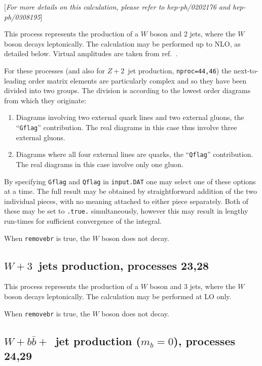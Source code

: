 \documentclass[12pt]{article}
\begin{document}
\begin{center}
[{\it For more details on this calculation, please refer to \break
 hep-ph/0202176 and hep-ph/0308195}]
\end{center}
This process represents the production of a $W$ boson and $2$ jets,
where the $W$ boson decays leptonically. The calculation may be
performed up to NLO, as detailed below. Virtual amplitudes are
taken from ref.~\cite{Bern:1997sc}.

For these processes (and also for $Z+2$~jet production, {\tt nproc=44,46})
the next-to-leading order matrix elements are
particularly complex and so they have been divided into two groups.
The division is according to the lowest order diagrams from which they
originate:
\begin{enumerate}
\item Diagrams involving two external quark lines and two external gluons,
the ``{\tt Gflag}'' contribution. The real diagrams in this case thus
involve three external gluons.

\item Diagrams where all four external lines are quarks,
the ``{\tt Qflag}'' contribution. The real diagrams in this case 
involve only one gluon.
\end{enumerate}

By specifying {\tt Gflag} and {\tt Qflag} in {\tt input.DAT} one may
select one of these options at a time. The full result may be obtained
by straightforward addition of the two individual pieces, with no
meaning attached to either piece separately. 
Both of these may be set to {\tt .true.} simultaneously, however this
may result in lengthy run-times for sufficient convergence of the integral.

When {\tt removebr} is true, the $W$ boson does not decay.

\subsection{$W+3$~jets production, processes 23,28}
\label{subsec:w3jets}

This process represents the production of a $W$ boson and $3$ jets,
where the $W$ boson decays leptonically. The calculation may be
performed at LO only.

When {\tt removebr} is true, the $W$ boson does not decay.

\subsection{$W+b{\bar b}+$~jet production ($m_b=0$), processes 24,29}
\label{subsec:wbbjetmassless}
\end{document}
